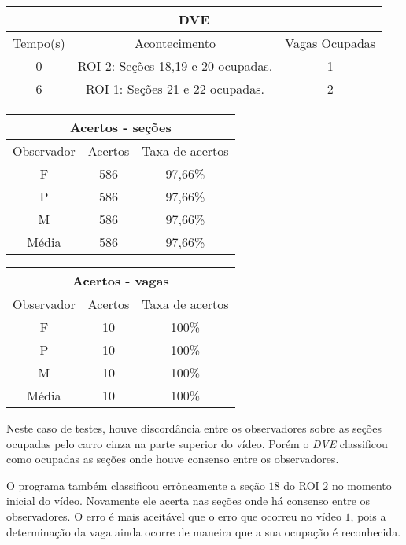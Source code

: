\begin{center}
\begin{tabular}{|c||c||c|}
\hline
\multicolumn{3}{|c|}{DVE}  \\ \hline \hline
Tempo(s) & Acontecimento & Vagas Ocupadas\\ \hline
0 & ROI 2: Seções 18,19 e 20 ocupadas. & 1 \\ \hline
6 & ROI 1: Seções 21 e 22 ocupadas. & 2 \\ \hline
\hline
\end{tabular}
\end{center}

\begin{center}
\begin{tabular}{|c||c||c|}
\hline
\multicolumn{3}{|c|}{Acertos - seções}  \\ \hline \hline
Observador & Acertos & Taxa de acertos \\ \hline
F & 586 & 97,66\% \\  \hline
P & 586 & 97,66\% \\ \hline
M & 586 & 97,66\% \\ \hline
Média & 586 & 97,66\% \\
\hline
\end{tabular}
\end{center}

\begin{center}
\begin{tabular}{|c||c||c|}
\hline
\multicolumn{3}{|c|}{Acertos - vagas}  \\ \hline \hline
Observador & Acertos & Taxa de acertos \\ \hline
F & 10 & 100\% \\  \hline
P & 10 & 100\% \\ \hline
M & 10 & 100\% \\ \hline
Média & 10 & 100\% \\
\hline
\end{tabular}
\end{center}

Neste caso de testes, houve discordância entre os observadores sobre as seções ocupadas pelo carro cinza na parte superior do vídeo. Porém o \textit{DVE} classificou como ocupadas as seções onde houve consenso entre os observadores.

O programa também classificou errôneamente a seção $18$ do ROI $2$ no momento inicial do vídeo. Novamente ele acerta nas seções onde há consenso entre os observadores. O erro é mais aceitável que o erro que ocorreu no vídeo $1$, pois a determinação da vaga ainda ocorre de maneira que a sua ocupação é reconhecida.

